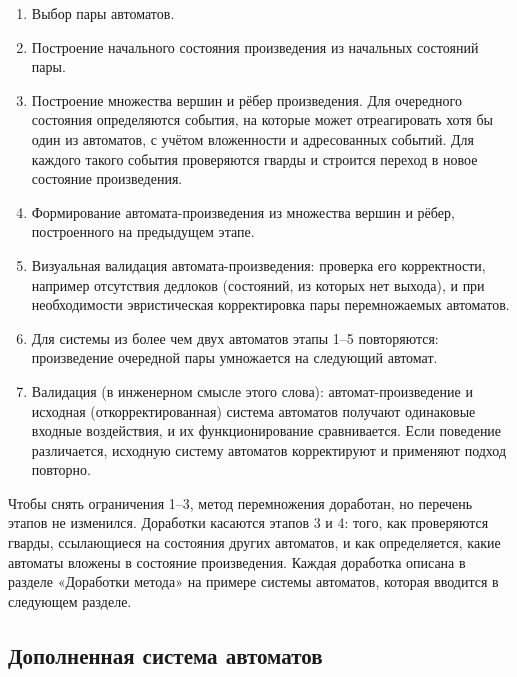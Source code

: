 \documentclass[12pt]{article}
\begin{document}
\begin{enumerate}
\item Выбор пары автоматов.
\item Построение начального состояния произведения из начальных состояний пары.
\item Построение множества вершин и рёбер произведения. Для очередного состояния определяются события, на которые может отреагировать хотя бы один из автоматов, с учётом вложенности и адресованных событий. Для каждого такого события проверяются гварды и строится переход в новое состояние произведения.
\item Формирование автомата-произведения из множества вершин и рёбер, построенного на предыдущем этапе.
\item Визуальная валидация автомата-произведения: проверка его корректности, например отсутствия дедлоков (состояний, из которых нет выхода), и при необходимости эвристическая корректировка пары перемножаемых автоматов.
\item Для системы из более чем двух автоматов этапы 1–5 повторяются: произведение очередной пары умножается на следующий автомат.
\item Валидация (в инженерном смысле этого слова): автомат-произведение и исходная (откорректированная) система автоматов получают одинаковые входные воздействия, и их функционирование сравнивается. Если поведение различается, исходную систему автоматов корректируют и применяют подход повторно.
\end{enumerate}

Чтобы снять ограничения 1–3, метод перемножения доработан, но перечень этапов не изменился. Доработки касаются этапов 3 и 4: того, как проверяются гварды, ссылающиеся на состояния других автоматов, и как определяется, какие автоматы вложены в состояние произведения. Каждая доработка описана в разделе «Доработки метода» на примере системы автоматов, которая вводится в следующем разделе.

\subsection*{Дополненная система автоматов}
\end{document}

